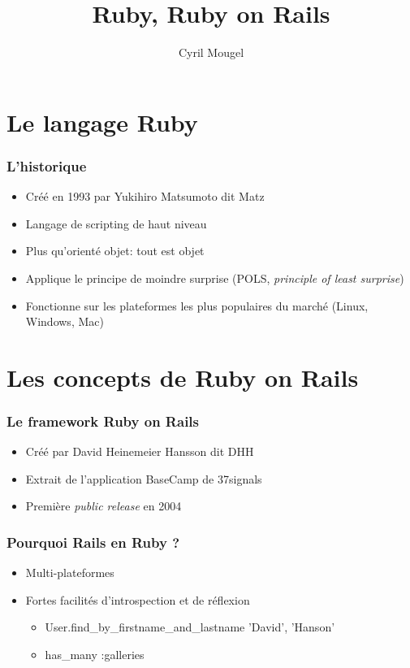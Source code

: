 \documentclass{beamer}
\title{Ruby, Ruby on Rails}
\author{Cyril Mougel}
\begin{document}
\begin{frame}
    \titlepage
\end{frame}

\section{Le langage Ruby}

\begin{frame}
	\frametitle{L'historique}
	\begin{itemize}
		\item Créé en 1993 par Yukihiro Matsumoto dit \og{}Matz\fg{}
		\item Langage de scripting de haut niveau
		\item Plus qu'orienté objet: tout est objet
        \item Applique le principe de moindre surprise (POLS, \emph{principle of
                least surprise})
        \item Fonctionne sur les plateformes les plus populaires du marché (Linux, Windows,
                Mac)
	\end{itemize}
\end{frame}

\section{Les concepts de Ruby on Rails}


\begin{frame}
    \frametitle{Le framework Ruby on Rails}
    \begin{itemize}
        \item Créé par David Heinemeier Hansson dit \og{}DHH\fg{}
        \item Extrait de l'application BaseCamp de 37signals
        \item Première \emph{public release} en 2004 
    \end{itemize}
\end{frame}

\begin{frame}
    \frametitle{Pourquoi Rails en Ruby ?}
    \begin{itemize}
        \item Multi-plateformes
        \item Fortes facilités d'introspection et de réflexion
            \begin{itemize}
                \item User.find\_by\_firstname\_and\_lastname 'David', 'Hanson'
                \item has\_many :galleries
            \end{itemize}
    \end{itemize}
\end{frame}
\end{document}
